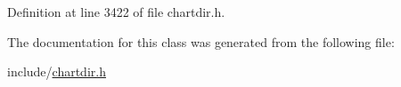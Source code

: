 Definition at line 3422 of file chartdir.\+h.



The documentation for this class was generated from the following file\+:\begin{DoxyCompactItemize}
\item 
include/\hyperlink{chartdir_8h}{chartdir.\+h}\end{DoxyCompactItemize}
